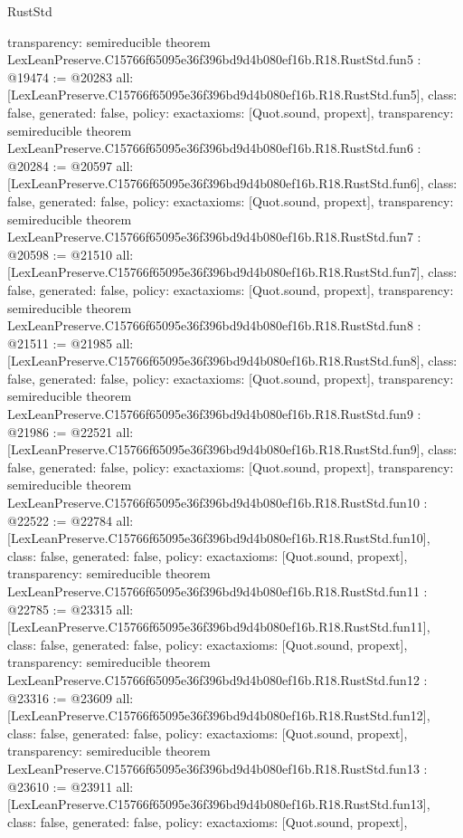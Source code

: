 \begin{lexlean}{RustStd}
\begin{coremodule}
{  transparency: semireducible
}
theorem LexLeanPreserve.C15766f65095e36f396bd9d4b080ef16b.R18.RustStd.fun5 : @19474 := @20283 {
  all: [LexLeanPreserve.C15766f65095e36f396bd9d4b080ef16b.R18.RustStd.fun5],
  class: false,
  generated: false,
  policy: exact{axioms: [Quot.sound, propext]},
  transparency: semireducible
}
theorem LexLeanPreserve.C15766f65095e36f396bd9d4b080ef16b.R18.RustStd.fun6 : @20284 := @20597 {
  all: [LexLeanPreserve.C15766f65095e36f396bd9d4b080ef16b.R18.RustStd.fun6],
  class: false,
  generated: false,
  policy: exact{axioms: [Quot.sound, propext]},
  transparency: semireducible
}
theorem LexLeanPreserve.C15766f65095e36f396bd9d4b080ef16b.R18.RustStd.fun7 : @20598 := @21510 {
  all: [LexLeanPreserve.C15766f65095e36f396bd9d4b080ef16b.R18.RustStd.fun7],
  class: false,
  generated: false,
  policy: exact{axioms: [Quot.sound, propext]},
  transparency: semireducible
}
theorem LexLeanPreserve.C15766f65095e36f396bd9d4b080ef16b.R18.RustStd.fun8 : @21511 := @21985 {
  all: [LexLeanPreserve.C15766f65095e36f396bd9d4b080ef16b.R18.RustStd.fun8],
  class: false,
  generated: false,
  policy: exact{axioms: [Quot.sound, propext]},
  transparency: semireducible
}
theorem LexLeanPreserve.C15766f65095e36f396bd9d4b080ef16b.R18.RustStd.fun9 : @21986 := @22521 {
  all: [LexLeanPreserve.C15766f65095e36f396bd9d4b080ef16b.R18.RustStd.fun9],
  class: false,
  generated: false,
  policy: exact{axioms: [Quot.sound, propext]},
  transparency: semireducible
}
theorem LexLeanPreserve.C15766f65095e36f396bd9d4b080ef16b.R18.RustStd.fun10 : @22522 := @22784 {
  all: [LexLeanPreserve.C15766f65095e36f396bd9d4b080ef16b.R18.RustStd.fun10],
  class: false,
  generated: false,
  policy: exact{axioms: [Quot.sound, propext]},
  transparency: semireducible
}
theorem LexLeanPreserve.C15766f65095e36f396bd9d4b080ef16b.R18.RustStd.fun11 : @22785 := @23315 {
  all: [LexLeanPreserve.C15766f65095e36f396bd9d4b080ef16b.R18.RustStd.fun11],
  class: false,
  generated: false,
  policy: exact{axioms: [Quot.sound, propext]},
  transparency: semireducible
}
theorem LexLeanPreserve.C15766f65095e36f396bd9d4b080ef16b.R18.RustStd.fun12 : @23316 := @23609 {
  all: [LexLeanPreserve.C15766f65095e36f396bd9d4b080ef16b.R18.RustStd.fun12],
  class: false,
  generated: false,
  policy: exact{axioms: [Quot.sound, propext]},
  transparency: semireducible
}
theorem LexLeanPreserve.C15766f65095e36f396bd9d4b080ef16b.R18.RustStd.fun13 : @23610 := @23911 {
  all: [LexLeanPreserve.C15766f65095e36f396bd9d4b080ef16b.R18.RustStd.fun13],
  class: false,
  generated: false,
  policy: exact{axioms: [Quot.sound, propext]},
}
\end{coremodule}
\end{lexlean}
